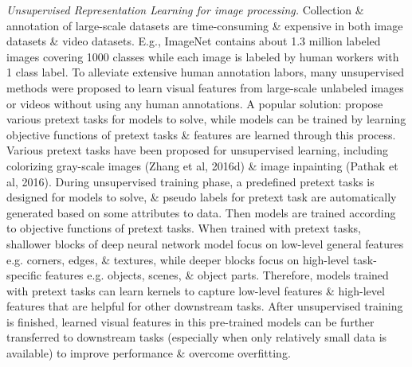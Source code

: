 \documentclass{article}
\begin{document}
\begin{itemize}
\begin{itemize}
\begin{itemize}
            {\it Unsupervised Representation Learning for image processing.} Collection \& annotation of large-scale datasets are time-consuming \& expensive in both image datasets \& video datasets. E.g., ImageNet contains about 1.3 million labeled images covering 1000 classes while each image is labeled by human workers with 1 class label. To alleviate extensive human annotation labors, many unsupervised methods were proposed to learn visual features from large-scale unlabeled images or videos without using any human annotations. A popular solution: propose various pretext tasks for models to solve, while models can be trained by learning objective functions of pretext tasks \& features are learned through this process. Various pretext tasks have been proposed for unsupervised learning, including colorizing gray-scale images (Zhang et al, 2016d) \& image inpainting (Pathak et al, 2016). During unsupervised training phase, a predefined pretext tasks is designed for models to solve, \& pseudo labels for pretext task are automatically generated based on some attributes to data. Then models are trained according to objective functions of pretext tasks. When trained with pretext tasks, shallower blocks of deep neural network model focus on low-level general features e.g. corners, edges, \& textures, while deeper blocks focus on high-level task-specific features e.g. objects, scenes, \& object parts. Therefore, models trained with pretext tasks can learn kernels to capture low-level features \& high-level features that are helpful for other downstream tasks. After unsupervised training is finished, learned visual features in this pre-trained models can be further transferred to downstream tasks (especially when only relatively small data is available) to improve performance \& overcome overfitting.


\end{itemize}
\end{itemize}
\end{itemize}
\end{document}
